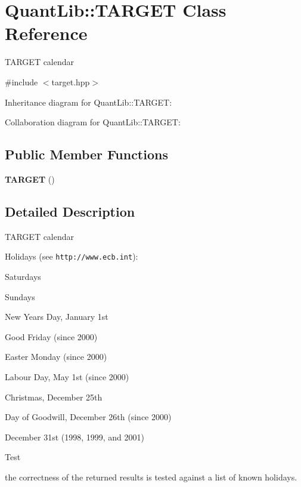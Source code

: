 \section{Quant\+Lib\+:\+:T\+A\+R\+G\+ET Class Reference}
\label{class_quant_lib_1_1_t_a_r_g_e_t}


T\+A\+R\+G\+ET calendar  




{\ttfamily \#include $<$target.\+hpp$>$}



Inheritance diagram for Quant\+Lib\+:\+:T\+A\+R\+G\+ET\+:


Collaboration diagram for Quant\+Lib\+:\+:T\+A\+R\+G\+ET\+:
\subsection*{Public Member Functions}
\begin{DoxyCompactItemize}
\item 
{\bf T\+A\+R\+G\+ET} ()
\end{DoxyCompactItemize}


\subsection{Detailed Description}
T\+A\+R\+G\+ET calendar 

Holidays (see {\tt http\+://www.\+ecb.\+int})\+: 
\begin{DoxyItemize}
\item Saturdays 
\item Sundays 
\item New Year\textquotesingle{}s Day, January 1st 
\item Good Friday (since 2000) 
\item Easter Monday (since 2000) 
\item Labour Day, May 1st (since 2000) 
\item Christmas, December 25th 
\item Day of Goodwill, December 26th (since 2000) 
\item December 31st (1998, 1999, and 2001) 
\end{DoxyItemize}

\begin{DoxyRefDesc}{Test}
\item[{\bf Test}]the correctness of the returned results is tested against a list of known holidays. \end{DoxyRefDesc}


